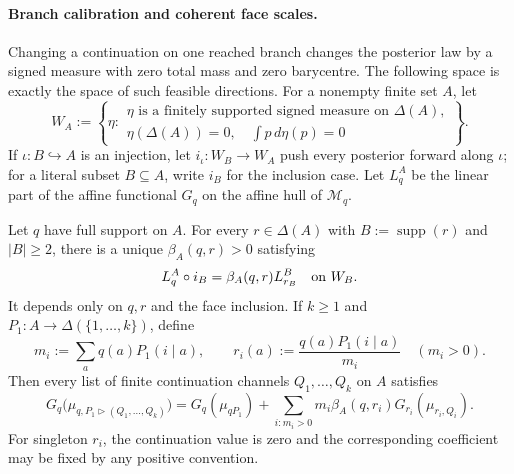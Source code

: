 \paragraph{Branch calibration and coherent face scales.}

Changing a continuation on one reached branch changes the posterior law by a
signed measure with zero total mass and zero barycentre.  The following space
is exactly the space of such feasible directions.
For a nonempty finite set $A$, let
\[
 W_A:=\left\{\eta:
 \begin{array}{l}
 \eta\text{ is a finitely supported signed measure on }\Delta(A),\\[-2pt]
 \eta(\Delta(A))=0,\quad \displaystyle\int p\,d\eta(p)=0
 \end{array}\right\}.
\]
If $\iota:B\hookrightarrow A$ is an injection, let
$i_\iota:W_B\to W_A$ push every posterior forward along $\iota$; for a
literal subset $B\subseteq A$, write $i_B$ for the inclusion case.  Let
$L_q^A$ be the linear part of the affine functional $G_q$ on the affine hull
of $\mathcal M_q$.

\begin{lemma}
\label{pt:lem:branchagg}
Let $q$ have full support on $A$.  For every $r\in\Delta(A)$ with
$B:=\operatorname{supp}(r)$ and $|B|\ge2$, there is a unique
$\beta_A(q,r)>0$ satisfying
\begin{equation}
 L_q^A\circ i_B=\beta_A(q,r)L_{r_B}^B
 \quad\hbox{on }W_B.
\label{pt:eq:branch-linear}
\end{equation}
It depends only on $q,r$ and the face inclusion.  If $k\ge1$ and
$P_1:A\to\Delta(\{1,\ldots,k\})$, define
\begin{equation}
 m_i:=\sum_aq(a)P_1(i\mid a),\qquad
 r_i(a):=\frac{q(a)P_1(i\mid a)}{m_i}\quad(m_i>0).
\label{pt:eq:branch-notation}
\end{equation}
Then every list of finite continuation channels $Q_1,\ldots,Q_k$ on $A$
satisfies
\begin{equation}
 G_q\bigl(\mu_{q,P_1\triangleright(Q_1,\ldots,Q_k)}\bigr)
 =G_q(\mu_{qP_1})+
 \sum_{i:m_i>0}m_i\beta_A(q,r_i)
 G_{r_i}(\mu_{r_i,Q_i}).
\tag{BA}\label{pt:eq:branchaggregation}
\end{equation}
For singleton $r_i$, the continuation value is zero and the corresponding
coefficient may be fixed by any positive convention.
\end{lemma}

